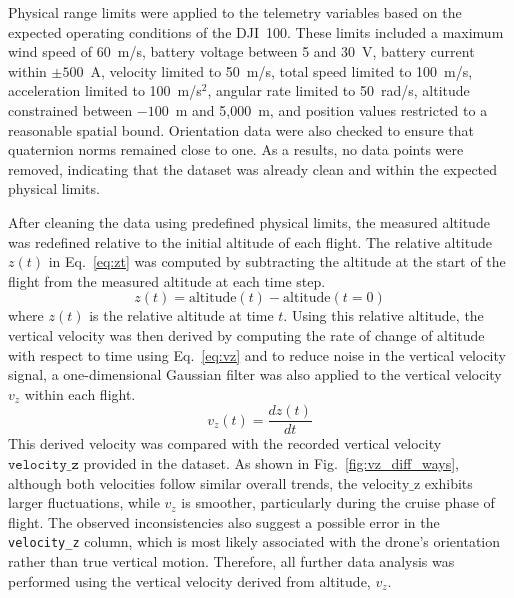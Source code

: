 Physical range limits were applied to the telemetry variables based on the expected operating conditions of the DJI~100. These limits included a maximum wind speed of 60~m/s, battery voltage between 5 and 30~V, battery current within $\pm 500$~A, velocity limited to 50~m/s, total speed limited to 100~m/s, acceleration limited to 100~m/s$^2$, angular rate limited to 50~rad/s, altitude constrained between $-100$~m and 5{,}000~m, and position values restricted to a reasonable spatial bound. Orientation data were also checked to ensure that quaternion norms remained close to one. As a results, no data points were removed, indicating that the dataset was already clean and within the expected physical limits.

After cleaning the data using predefined physical limits, the measured altitude was redefined relative to the initial altitude of each flight. The relative altitude $z(t)$ in  Eq.~\eqref{eq:zt} was computed by subtracting the altitude at the start of the flight from the measured altitude at each time step.
\begin{equation}
    z(t) = \text{altitude}(t) - \text{altitude}(t=0)
    \label{eq:zt}
\end{equation}
where $ z(t) $ is the relative altitude at time $ t $.
Using this relative altitude, the vertical velocity was then derived by computing the rate of change of altitude with respect to time
using Eq.~\eqref{eq:vz} and to reduce noise in the vertical velocity signal, a one-dimensional Gaussian filter was  also applied to the vertical velocity  $v_z$  within each flight.\\
\begin{equation}
v_{z}(t) = \frac{dz(t)}{dt}
\label{eq:vz}
\end{equation}
This derived velocity was compared with the recorded vertical velocity $\texttt{velocity\_z}$ provided in the dataset. As shown in Fig.~\ref{fig:vz_diff_ways}, although both  velocities follow similar overall trends, the $\text{velocity\_z}$ exhibits larger fluctuations, while  $v_z$ is smoother, particularly during the cruise phase of flight. The observed inconsistencies also suggest a possible error in the \texttt{velocity\_z} column, which is most likely associated with the drone’s orientation rather than true vertical motion. Therefore, all further data analysis was performed using the vertical velocity derived from altitude, $v_z$.

